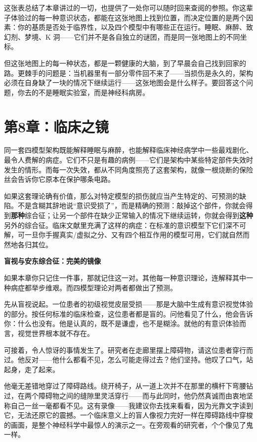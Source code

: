\documentclass[11pt, twoside, openright]{book}
\begin{document}
这张表总结了本章讲过的一切，也提供了一处你可以随时回来查阅的参照。你这辈子体验过的每一种意识状态，都能在这张地图上找到位置，而决定位置的是两个因素：你的基质是否处于临界性，以及四个模型中有哪些正在运行。睡眠、麻醉、致幻剂、梦境、K 洞------它们并不是各自独立的谜团，而是同一张地图上的不同坐标。

但这张地图上的每一种状态，都是一颗健康的大脑，到了早晨会自己找到回家的路。更棘手的问题是：当机器里有一部分零件回不来了------当损伤是永久的，架构必须在自身缺了一块的情况下继续运行------这张地图会是什么样子。要回答这个问题，你去的不是睡眠实验室，而是神经科病房。


\chapter*{第8章：临床之镜}

同一套四模型架构既能解释睡眠与麻醉，也能解释临床神经病学中一些最戏剧化、最令人费解的病症。它们不只是有趣的病例------它们是架构中某些特定部件失效时发生的情形。而每一次失效，都从不同角度照亮了这套架构，就像一根烧断的保险丝会告诉你它原本在保护哪条电路。

如果这套理论确有价值，那么对特定模型的损伤就应当产生特定的、可预测的缺陷。不是含糊其辞地说“意识受损了”，而是精确的预测：敲掉这个部件，你就会得到\textbf{那种}综合征；让另一个部件在缺少正常输入的情况下继续运转，你就会得到\textbf{这种}另外的综合征。临床文献里充满了这样的病症：在标准的意识模型下它们深不可解，可一旦你手握真实/虚拟之分、又有四个相互作用的模型可用，它们就自然而然地各归其位。

\textbf{盲视与安东综合征：完美的镜像}

如果本章你只记住一件事，那就记住这一对。其他每一种意识理论，连解释其中一种病症都举步维艰。而四模型理论对两者都做出了预测。

先从盲视说起。一位患者的初级视觉皮层受损------那是大脑中生成有意识视觉体验的部分。按任何标准的临床检查，这位患者都是盲的。问他看见了什么，他会告诉你：什么也没有。他是认真的，既不是谦虚，也不是糊涂。就他的有意识体验而言，视觉世界根本就不存在。

可接着，令人惊讶的事情发生了。研究者在走廊里摆上障碍物，请这位患者穿行而过。他反对------他什么都看不见，怎么可能走得过去？他们坚持。他叹了口气，站起身，走了起来。

他毫无差错地穿过了障碍路线。绕开椅子，从一道上次并不在那里的横杆下弯腰钻过，在两个障碍物之间的缝隙里灵活穿行------而与此同时，他仍然真诚而由衷地坚称自己一丝一毫都看不见。这有录像------我建议你去找来看看，因为光靠文字读到它，无法还原它的震撼。一个临床意义上的盲人像视力完好一样在障碍路线中穿梭的画面，是整个神经科学中最惊人的演示之一。在旁观看的研究者，个个像见了鬼一样。
\end{document}
